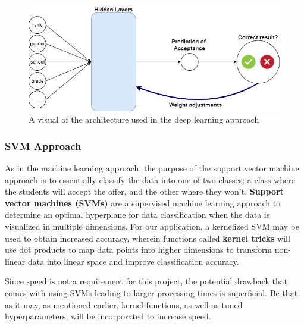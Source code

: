 \documentclass{article}
\begin{document}
\begin{normalsize}
            \begin{figure}
               \centering \includegraphics[width=350pt]{images/neuralNetwork.png}
                \caption{A visual of the architecture used in the deep learning approach}
                \label{fig:nnApproach}
            \end{figure}
        
        \newpage
        
        \subsubsection{SVM Approach}
        
        
        As in the machine learning approach, the purpose of the support vector machine approach is to essentially classify the data into one of two classes: a class where the students will accept the offer, and the other where they won't.
        \textbf{Support vector machines (SVMs)} are a supervised machine learning approach to determine an optimal hyperplane for data classification when the data is visualized in multiple dimensions. 
        For our application, a kernelized SVM may be used to obtain increased accuracy, wherein functions called \textbf{kernel tricks} will use dot products to map data points into higher dimensions to transform non-linear data into linear space and improve classification accuracy.
        
        Since speed is not a requirement for this project, the potential drawback that comes with using SVMs leading to larger processing times  is superficial\footnotemark. 
        Be that as it may, as mentioned earlier, kernel functions, as well as tuned hyperparameters, will be incorporated to increase speed.
        

\end{normalsize}
\end{document}
